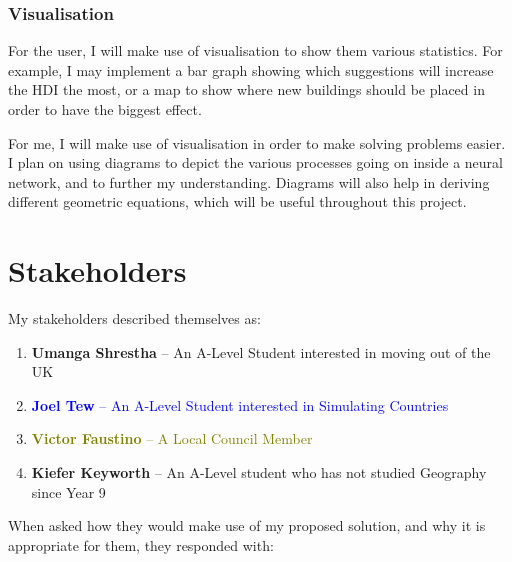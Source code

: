 \documentclass[12pt]{report}
\begin{document}
\subsubsection{Visualisation}
For the user, I will make use of visualisation to show them various statistics. For example, I may implement a bar graph showing which suggestions will increase the HDI the most, or a map to show where new buildings should be placed in order to have the biggest effect.

For me, I will make use of visualisation in order to make solving problems easier. I plan on using diagrams to depict the various processes going on inside a neural network, and to further my understanding. Diagrams will also help in deriving different geometric equations, which will be useful throughout this project.

\section{Stakeholders}
My stakeholders described themselves as:
\begin{enumerate}
    \item \textcolor{Sepia}{\textbf{Umanga Shrestha} -- An A-Level Student interested in moving out of the UK}
    \item \textcolor{Blue}{\textbf{Joel Tew} -- An A-Level Student interested in Simulating Countries}
    \item \textcolor{olive}{\textbf{Victor Faustino} -- A Local Council Member}
    \item \textcolor{OliveGreen}{\textbf{Kiefer Keyworth} -- An A-Level student who has not studied Geography since Year 9}
\end{enumerate}
When asked how they would make use of my proposed solution, and why it is appropriate for them, they responded with:
\end{document}

